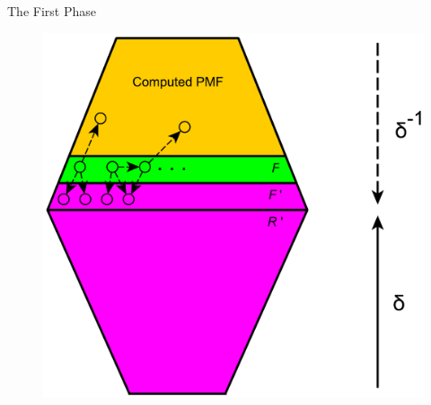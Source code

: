 \documentclass{beamer}
\begin{document}
\begin{frame}{The First Phase}

	\begin{figure}
		\includegraphics[height=0.8\textheight]{figs/f2r.pdf}
	\end{figure}
\end{frame}
%
%	
%	
\end{document}
